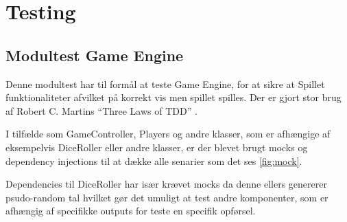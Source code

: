 \section{Testing}
\subsection{Modultest Game Engine}
Denne modultest har til formål at teste Game Engine, for at sikre at Spillet
funktionaliteter afvilket på korrekt vis men spillet spilles. Der er gjort
stor brug af Robert C. Martins ``Three Laws of TDD'' \parencite[Side 122]{CleanCode}.

I tilfælde som GameController, Players og andre klasser, som er afhængige af 
eksempelvis DiceRoller eller andre klasser, er der blevet brugt mocks og
dependency injections til at dække alle senarier som det ses \autoref{fig:mock}.

Dependencies til DiceRoller har især krævet mocks da denne ellers genererer 
psudo-random tal hvilket gør det umuligt at test andre komponenter, som er 
afhængig af specifikke outputs for teste en specifik opførsel.

\newpage 

